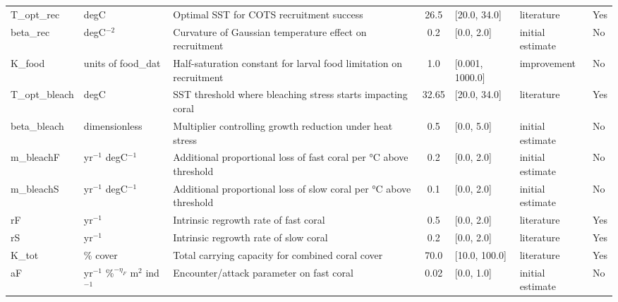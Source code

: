 \begin{landscape}
\begin{table}[ht]
\begin{tabularx}{1.0\linewidth}{l p{3cm} p{7cm} c l l l}
T\_opt\_rec & degC & Optimal SST for COTS recruitment success & 26.5 & [20.0, 34.0] & literature & Yes \citep{Pratchett_Caballes_Wilmes_Matthews_Mellin_Sweatman_Nadler_Brodie_Thompson_Hoey_et_al_2017, morello2014model, Condie_Anthony_Babcock_Baird_Beeden_Fletcher_Gorton_Harrison_Hobday_Plaganyi_et_al_2021} \\
beta\_rec & degC$^{-2}$ & Curvature of Gaussian temperature effect on recruitment & 0.2 & [0.0, 2.0] & initial estimate & No \\
K\_food & units of food\_dat & Half-saturation constant for larval food limitation on recruitment & 1.0 & [0.001, 1000.0] & improvement & No \\
T\_opt\_bleach & degC & SST threshold where bleaching stress starts impacting coral & 32.65 & [20.0, 34.0] & literature & Yes \citep{Rogers_Plaganyi_2022, Condie_Anthony_Babcock_Baird_Beeden_Fletcher_Gorton_Harrison_Hobday_Plaganyi_et_al_2021} \\
beta\_bleach & dimensionless & Multiplier controlling growth reduction under heat stress & 0.5 & [0.0, 5.0] & initial estimate & No \\
m\_bleachF & yr$^{-1}$ degC$^{-1}$ & Additional proportional loss of fast coral per °C above threshold & 0.2 & [0.0, 2.0] & initial estimate & No \\
m\_bleachS & yr$^{-1}$ degC$^{-1}$ & Additional proportional loss of slow coral per °C above threshold & 0.1 & [0.0, 2.0] & initial estimate & No \\
rF & yr$^{-1}$ & Intrinsic regrowth rate of fast coral & 0.5 & [0.0, 2.0] & literature & Yes \citep{Pratchett_Caballes_Wilmes_Matthews_Mellin_Sweatman_Nadler_Brodie_Thompson_Hoey_et_al_2017, Condie_Anthony_Babcock_Baird_Beeden_Fletcher_Gorton_Harrison_Hobday_Plaganyi_et_al_2021} \\
rS & yr$^{-1}$ & Intrinsic regrowth rate of slow coral & 0.2 & [0.0, 2.0] & literature & Yes \citep{Pratchett_Caballes_Wilmes_Matthews_Mellin_Sweatman_Nadler_Brodie_Thompson_Hoey_et_al_2017, Condie_Anthony_Babcock_Baird_Beeden_Fletcher_Gorton_Harrison_Hobday_Plaganyi_et_al_2021} \\
K\_tot & \% cover & Total carrying capacity for combined coral cover & 70.0 & [10.0, 100.0] & literature & Yes \citep{Condie_Anthony_Babcock_Baird_Beeden_Fletcher_Gorton_Harrison_Hobday_Plaganyi_et_al_2021, Rogers_Plaganyi_2022} \\
aF & yr$^{-1}$ \%$^{-\eta_F}$ m$^{2}$ ind$^{-1}$ & Encounter/attack parameter on fast coral & 0.02 & [0.0, 1.0] & initial estimate & No \\

\end{tabularx}
\end{table}
\end{landscape}
